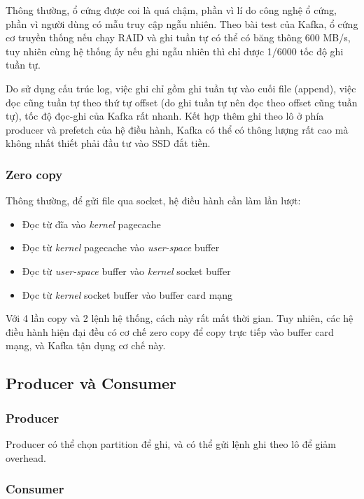 \documentclass{article}
\begin{document}
Thông thường, ổ cứng được coi là quá chậm, phần vì lí do công nghệ ổ cứng, phần
vì người dùng có mẫu truy cập ngẫu nhiên. Theo bài test của Kafka, ổ cứng cơ
truyền thống nếu chạy RAID và ghi tuần tự có thể có băng thông 600 MB/s, tuy
nhiên cùng hệ thống ấy nếu ghi ngẫu nhiên thì chỉ được 1/6000 tốc độ ghi tuần
tự.

Do sử dụng cấu trúc log, việc ghi chỉ gồm ghi tuần tự vào cuối file (append),
việc đọc cũng tuần tự theo thứ tự offset (do ghi tuần tự nên đọc theo offset
cũng tuần tự), tốc độ đọc-ghi của Kafka rất nhanh. Kết hợp thêm ghi theo lô ở
phía producer và prefetch của hệ điều hành, Kafka có thể có thông lượng rất cao
mà không nhất thiết phải đầu tư vào SSD đắt tiền.

\subsubsection{Zero copy}

Thông thường, để gửi file qua socket, hệ điều hành cần làm lần lượt:

\begin{itemize}
    \item Đọc từ đĩa vào \emph{kernel} pagecache
    \item Đọc từ \emph{kernel} pagecache vào \emph{user-space} buffer
    \item Đọc từ \emph{user-space} buffer vào \emph{kernel} socket buffer
    \item Đọc từ \emph{kernel} socket buffer vào buffer card mạng
\end{itemize}

Với 4 lần copy và 2 lệnh hệ thống, cách này rất mất thời gian. Tuy nhiên, các hệ
điều hành hiện đại đều có cơ chế zero copy để copy trực tiếp vào buffer card
mạng, và Kafka tận dụng cơ chế này.

\subsection{Producer và Consumer}

\subsubsection{Producer}

Producer có thể chọn partition để ghi, và có thể gửi lệnh ghi theo lô để giảm
overhead.

\subsubsection{Consumer}
\end{document}
